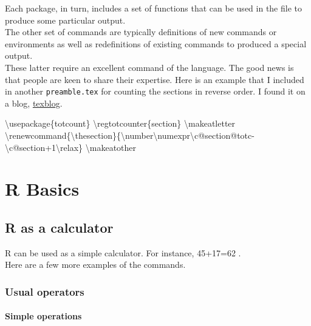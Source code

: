 \documentclass[]{book}
\newenvironment{Shaded}{}{}
\newcommand{\BuiltInTok}[1]{#1}
\newcommand{\ExtensionTok}[1]{#1}
\newcommand{\FunctionTok}[1]{\textcolor[rgb]{0.02,0.16,0.49}{#1}}
\newcommand{\NormalTok}[1]{#1}
\theoremstyle{definition}
\theoremstyle{definition}
\theoremstyle{definition}
\theoremstyle{remark}
\begin{document}
Each package, in turn, includes a set of functions that can be used in
the file to produce some particular output.\\
The other set of commands are typically definitions of new commands or
environments as well as redefinitions of existing commands to produced a
special output.\\
These latter require an excellent command of the language. The good news
is that people are keen to share their expertise. Here is an example
that I included in another \texttt{preamble.tex} for counting the
sections in reverse order. I found it on a blog,
\href{https://texblog.org/2013/04/03/reverse-numbering-for-chapters-sections-etc/}{texblog}.

\begin{Shaded}
\begin{Highlighting}[]
\BuiltInTok{\textbackslash{}usepackage}\NormalTok{\{}\ExtensionTok{totcount}\NormalTok{\}}
\FunctionTok{\textbackslash{}regtotcounter}\NormalTok{\{section\}}
\FunctionTok{\textbackslash{}makeatletter}
    \FunctionTok{\textbackslash{}renewcommand}\NormalTok{\{}\ExtensionTok{\textbackslash{}thesection}\NormalTok{\}\{}\FunctionTok{\textbackslash{}number\textbackslash{}numexpr\textbackslash{}c@section@totc}\NormalTok{-}\FunctionTok{\textbackslash{}c@section+}\NormalTok{1}\FunctionTok{\textbackslash{}relax}\NormalTok{\}}
\FunctionTok{\textbackslash{}makeatother}
\end{Highlighting}
\end{Shaded}

\hypertarget{part-r-basics}{%
\part{R Basics}\label{part-r-basics}}

\hypertarget{rcalc}{%
\chapter{R as a calculator}\label{rcalc}}

R can be used as a simple calculator. For instance, 45+17=62 .\\
Here are a few more examples of the commands.

\hypertarget{usual-operators}{%
\section{Usual operators}\label{usual-operators}}

\hypertarget{simple-operations}{%
\subsection{Simple operations}\label{simple-operations}}
\end{document}
